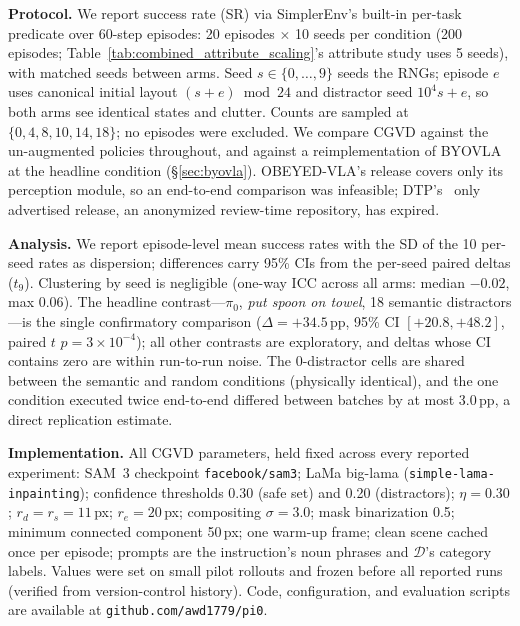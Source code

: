 \documentclass[letterpaper, 10 pt, conference]{ieeeconf}  %
\newif\ifanonymous
\begin{document}
\textbf{Protocol.} We report success rate (SR) via SimplerEnv's built-in per-task predicate over 60-step episodes: 20 episodes $\times$ 10 seeds per condition (200 episodes; Table~\ref{tab:combined_attribute_scaling}'s attribute study uses 5 seeds), with matched seeds between arms. Seed $s \in \{0,\dots,9\}$ seeds the RNGs; episode $e$ uses canonical initial layout $(s{+}e) \bmod 24$ and distractor seed $10^4 s + e$, so both arms see identical states and clutter. Counts are sampled at $\{0, 4, 8, 10, 14, 18\}$; no episodes were excluded. We compare CGVD against the un-augmented policies throughout, and against a reimplementation of BYOVLA~\cite{byovla} at the headline condition (\S\ref{sec:byovla}). OBEYED-VLA's release covers only its perception module, so an end-to-end comparison was infeasible; DTP's~\cite{dtp} only advertised release, an anonymized review-time repository, has expired.

\textbf{Analysis.} We report episode-level mean success rates with the SD of the 10 per-seed rates as dispersion; differences carry 95\% CIs from the per-seed paired deltas ($t_9$). Clustering by seed is negligible (one-way ICC across all arms: median $-0.02$, max $0.06$). The headline contrast---$\pi_0$, \textit{put spoon on towel}, 18 semantic distractors---is the single confirmatory comparison ($\Delta = +34.5$\,pp, 95\% CI $[+20.8, +48.2]$, paired $t$ $p = 3{\times}10^{-4}$); all other contrasts are exploratory, and deltas whose CI contains zero are within run-to-run noise. The 0-distractor cells are shared between the semantic and random conditions (physically identical), and the one condition executed twice end-to-end differed between batches by at most 3.0\,pp, a direct replication estimate.

\textbf{Implementation.} All CGVD parameters, held fixed across every reported experiment: SAM~3 checkpoint \texttt{facebook/sam3}; LaMa big-lama (\texttt{simple-lama-inpainting}); confidence thresholds 0.30 (safe set) and 0.20 (distractors); $\eta = 0.30$; $r_d = r_s = 11$\,px; $r_e = 20$\,px; compositing $\sigma = 3.0$; mask binarization 0.5; minimum connected component 50\,px; one warm-up frame; clean scene cached once per episode; prompts are the instruction's noun phrases and $\mathcal{D}$'s category labels. Values were set on small pilot rollouts and frozen before all reported runs (verified from version-control history). \ifanonymous Code, configuration, and evaluation scripts will be publicly released upon acceptance.\else Code, configuration, and evaluation scripts are available at \texttt{github.com/awd1779/pi0}.\fi
\end{document}
